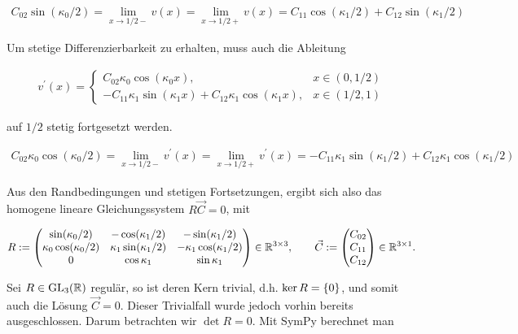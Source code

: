 \begin{align*}
  C_{02} \sin(\kappa_0/2)
  = \lim_{x \to 1/2-} v(x)
  = \lim_{x \to 1/2+} v(x)
  = C_{11} \cos(\kappa_1/2) + C_{12} \sin(\kappa_1/2)
\end{align*}

Um stetige Differenzierbarkeit zu erhalten, muss auch die Ableitung

\begin{align*}
  v^\prime(x) =
  \begin{cases}
    C_{02} \kappa_0 \cos(\kappa_0 x),
    & x \in (0, 1/2) \\
    - C_{11} \kappa_1 \sin(\kappa_1 x) + C_{12} \kappa_1 \cos(\kappa_1 x),
    & x \in (1/2, 1)
  \end{cases}
\end{align*}

auf $1/2$ stetig fortgesetzt werden.

\begin{align*}
  C_{02} \kappa_0 \cos(\kappa_0/2)
  = \lim_{x \to 1/2-} v^\prime(x)
  = \lim_{x \to 1/2+} v^\prime(x)
  = - C_{11} \kappa_1 \sin(\kappa_1/2) + C_{12} \kappa_1 \cos(\kappa_1/2)
\end{align*}

Aus den Randbedingungen und stetigen Fortsetzungen, ergibt sich also das homogene lineare Gleichungssystem $R \vec C = 0$, mit

\begin{align*}
  R :=
  \begin{pmatrix}
    \sin(\kappa_0/2)          & -\cos(\kappa_1/2)         & -\sin(\kappa_1/2) \\
    \kappa_0 \cos(\kappa_0/2) & \kappa_1 \sin(\kappa_1/2) & - \kappa_1 \cos(\kappa_1/2) \\
    0                         & \cos{\kappa_1}            & \sin{\kappa_1}
  \end{pmatrix}
  \in \R^{3 \times 3}, \qquad
  \vec C :=
  \begin{pmatrix}
    C_{02} \\
    C_{11} \\
    C_{12}
  \end{pmatrix}
  \in \R^{3 \times 1}.
\end{align*}

Sei $R \in \GL[3]{\R}$ regulär, so ist deren Kern trivial, d.h. $\ker{R} = \Bbraces{0}$, und somit auch die Lösung $\vec C = 0$. Dieser Trivialfall wurde jedoch vorhin bereits ausgeschlossen. Darum betrachten wir $\det{R} = 0$. Mit SymPy berechnet man

